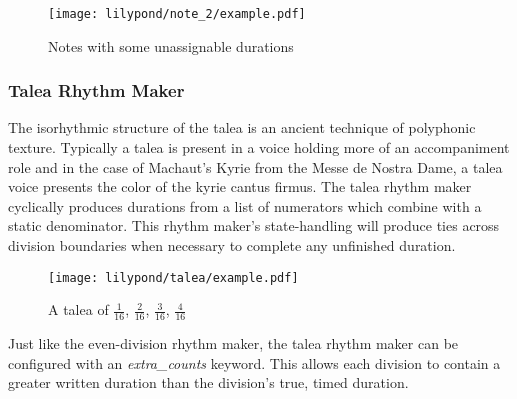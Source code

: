 \begin{figure}[H]
    \texttt{[image: lilypond/note\_2/example.pdf]}
    \caption{Notes with some unassignable durations}
    \label{fig:unusualnote}
\end{figure}

\subsubsection{Talea Rhythm Maker}

The isorhythmic structure of the talea is an ancient technique of polyphonic texture. Typically a talea is present in a voice holding more of an accompaniment role and in the case of Machaut's Kyrie from the Messe de Nostra Dame, a talea voice presents the color of the kyrie cantus firmus. The talea rhythm maker cyclically produces durations from a list of numerators which combine with a static denominator. This rhythm maker's state-handling will produce ties across division boundaries when necessary to complete any unfinished duration.


\begin{figure}[H]
    \texttt{[image: lilypond/talea/example.pdf]}
    \caption{A talea of $\frac{1}{16}$, $\frac{2}{16}$, $\frac{3}{16}$, $\frac{4}{16}$}
    \label{fig:talea}
\end{figure}

Just like the even-division rhythm maker, the talea rhythm maker can be configured with an \textit{extra\_counts} keyword. This allows each division to contain a greater written duration than the division's true, timed duration.


